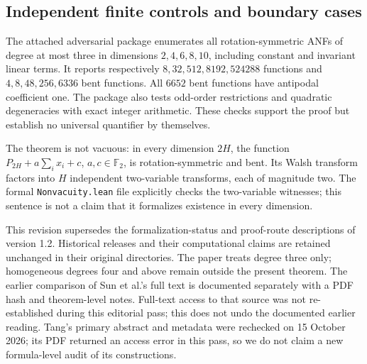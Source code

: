 \documentclass[11pt,a4paper]{article}
\theoremstyle{remark}
\theoremstyle{plain}
\newcommand{\F}{\mathbb F_2}
\begin{document}
\subsection{Independent finite controls and boundary cases}
The attached adversarial package enumerates all rotation-symmetric ANFs of degree at most three in dimensions $2,4,6,8,10$, including constant and invariant linear terms. It reports respectively $8,32,512,8192,524288$ functions and $4,8,48,256,6336$ bent functions. All $6652$ bent functions have antipodal coefficient one. The package also tests odd-order restrictions and quadratic degeneracies with exact integer arithmetic. These checks support the proof but establish no universal quantifier by themselves.

The theorem is not vacuous: in every dimension $2H$, the function $P_{2H}+a\sum_i x_i+c$, $a,c\in\F$, is rotation-symmetric and bent. Its Walsh transform factors into $H$ independent two-variable transforms, each of magnitude two. The formal \nolinkurl{Nonvacuity.lean} file explicitly checks the two-variable witnesses; this sentence is not a claim that it formalizes existence in every dimension.

This revision supersedes the formalization-status and proof-route descriptions of version 1.2. Historical releases and their computational claims are retained unchanged in their original directories. The paper treats degree three only; homogeneous degrees four and above remain outside the present theorem. The earlier comparison of Sun et al.'s full text is documented separately with a PDF hash and theorem-level notes. Full-text access to that source was not re-established during this editorial pass; this does not undo the documented earlier reading. Tang's primary abstract and metadata were rechecked on 15 October 2026; its PDF returned an access error in this pass, so we do not claim a new formula-level audit of its constructions.
\end{document}
